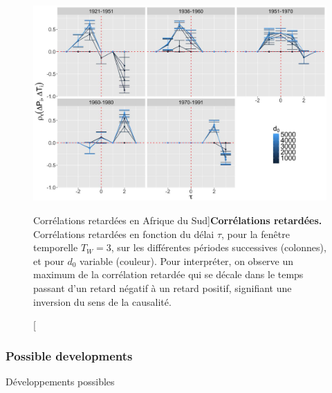 \begin{figure}
\includegraphics[width=\linewidth]{Figures/Final/4-2-3-fig-causalityregimes-sudafcorrs.jpg}
\caption[Lagged correlations in South Africa][Corrélations retardées en Afrique du Sud]{\label{fig:causalityregimes:sudafcorrs}}{\textbf{Corrélations retardées.}  Corrélations retardées en fonction du délai $\tau$, pour la fenêtre temporelle $T_W=3$, sur les différentes périodes successives (colonnes), et pour $d_0$ variable (couleur). Pour interpréter, on observe un maximum de la corrélation retardée qui se décale dans le temps passant d'un retard négatif à un retard positif, signifiant une inversion du sens de la causalité.\label{fig:causalityregimes:sudafcorrs}}
\end{figure}



\subsubsection{Possible developments}{Développements possibles}

